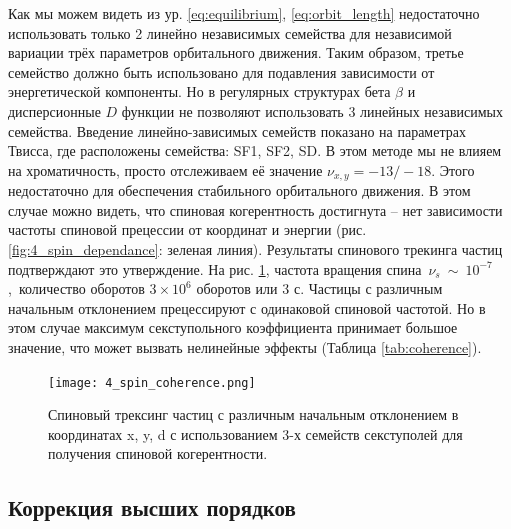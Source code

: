 \par Как мы можем видеть из ур. \ref{eq:equilibrium}, \ref{eq:orbit_length} недостаточно использовать только 2 линейно независимых семейства для независимой вариации трёх параметров орбитального движения. Таким образом, третье семейство должно быть использовано для подавления зависимости от энергетической компоненты. Но в регулярных структурах бета $\beta$ и дисперсионные $D$ функции не позволяют использовать 3 линейных независимых семейства. Введение линейно-зависимых семейств показано на параметрах Твисса, где расположены семейства: SF1, SF2, SD. В этом методе мы не влияем на хроматичность, просто отслеживаем её значение $\nu_{x,y}=-13/-18$. Этого недостаточно для обеспечения стабильного орбитального движения. В этом случае можно видеть, что спиновая когерентность достигнута -- нет зависимости частоты спиновой прецессии от координат и энергии (рис. \ref{fig:4_spin_dependance}: зеленая линия). Результаты спинового трекинга частиц подтверждают это утверждение. На рис. \ref{fig:4_spin_coherence}, частота вращения спина~$\nu_s~\sim~{10}^{-7}$,~количество оборотов $3\times{10}^6$ оборотов или $3$ с. Частицы с различным начальным отклонением прецессируют с одинаковой спиновой частотой. Но в этом случае максимум секступольного коэффициента принимает большое значение, что может вызвать нелинейные эффекты (Таблица \ref{tab:coherence}).

\begin{figure}[!h]
  \centering
   \texttt{[image: 4\_spin\_coherence.png]}
   \caption{Спиновый трексинг частиц с различным начальным отклонением в координатах x, y, d с использованием 3-х семейств секступолей для получения спиновой когерентности.}
   \label{fig:4_spin_coherence}
\end{figure}

		\subsection{Коррекция высших порядков}\label{sec:EDM/Wien_filter_tracking/correction}

